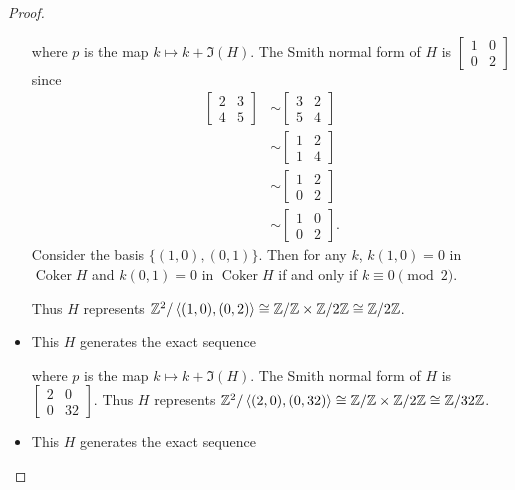 \documentclass[12pt, psamsfonts]{amsart}
\theoremstyle{definition}
\theoremstyle{remark}
\DeclareMathOperator{\Coker}{Coker}
\numberwithin{equation}{section}
\begin{document}
\begin{proof}
\begin{itemize}
      where $p$ is the map $k \mapsto k + \Im(H)$.
      The Smith normal form of $H$ is $\begin{bmatrix} 1 & 0 \\ 0 & 2 \end{bmatrix}$ since
      \begin{align*}
        \begin{bmatrix} 2 & 3 \\ 4 & 5 \end{bmatrix}
          &\sim \begin{bmatrix} 3 & 2 \\ 5 & 4 \end{bmatrix} \\
          &\sim \begin{bmatrix} 1 & 2 \\ 1 & 4 \end{bmatrix} \\
          &\sim \begin{bmatrix} 1 & 2 \\ 0 & 2 \end{bmatrix} \\
          &\sim \begin{bmatrix} 1 & 0 \\ 0 & 2 \end{bmatrix}.
      \end{align*}
      Consider the basis $\{ (1, 0), (0, 1) \}$.
      Then for any $k$, $k(1, 0) = 0$ in $\Coker{H}$ and $k(0, 1) = 0$ in $\Coker{H}$ if and only if $k \equiv 0 \pmod 2$.

      Thus $H$ represents $\mathbb{Z}^2/\ev{(1, 0), (0, 2)} \cong \mathbb{Z}/\mathbb{Z} \times \mathbb{Z}/2\mathbb{Z} \cong \mathbb{Z}/2\mathbb{Z}$.
    \item
      This $H$ generates the exact sequence

      \begin{center}
      \end{center}

      where $p$ is the map $k \mapsto k + \Im(H)$.
      The Smith normal form of $H$ is $\begin{bmatrix} 2 & 0 \\ 0 & 32 \end{bmatrix}$.
      Thus $H$ represents $\mathbb{Z}^2/\ev{(2, 0), (0, 32)} \cong \mathbb{Z}/\mathbb{Z} \times \mathbb{Z}/2\mathbb{Z} \cong \mathbb{Z}/32\mathbb{Z}$.
    \item
      This $H$ generates the exact sequence


\end{itemize}
\end{proof}
\end{document}
